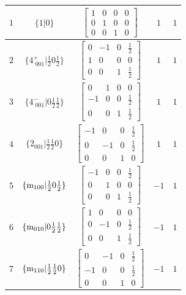 \documentclass[fleqn,8pt]{jsarticle}
\begin{document}
\begin{longtable}{ccccc}
$ 1 $ & $ \{1|0\} $ & $ \begin{bmatrix} 1 & 0 & 0 & 0 \\ 0 & 1 & 0 & 0 \\ 0 & 0 & 1 & 0 \end{bmatrix} $ & $ 1 $ & $ 1 $ \\ \hline
$ 2 $ & $ \{4^{+}_{\,\,001}|\frac{1}{2} 0 \frac{1}{2}\} $ & $ \begin{bmatrix} 0 & -1 & 0 & \frac{1}{2} \\ 1 & 0 & 0 & 0 \\ 0 & 0 & 1 & \frac{1}{2} \end{bmatrix} $ & $ 1 $ & $ 1 $ \\ \hline
$ 3 $ & $ \{4^{-}_{\,\,001}|0 \frac{1}{2} \frac{1}{2}\} $ & $ \begin{bmatrix} 0 & 1 & 0 & 0 \\ -1 & 0 & 0 & \frac{1}{2} \\ 0 & 0 & 1 & \frac{1}{2} \end{bmatrix} $ & $ 1 $ & $ 1 $ \\ \hline
$ 4 $ & $ \{2{}_{001}|\frac{1}{2} \frac{1}{2} 0\} $ & $ \begin{bmatrix} -1 & 0 & 0 & \frac{1}{2} \\ 0 & -1 & 0 & \frac{1}{2} \\ 0 & 0 & 1 & 0 \end{bmatrix} $ & $ 1 $ & $ 1 $ \\ \hline
$ 5 $ & $ \{{\rm m}_{100}|\frac{1}{2} 0 \frac{1}{2}\} $ & $ \begin{bmatrix} -1 & 0 & 0 & \frac{1}{2} \\ 0 & 1 & 0 & 0 \\ 0 & 0 & 1 & \frac{1}{2} \end{bmatrix} $ & $ -1 $ & $ 1 $ \\ \hline
$ 6 $ & $ \{{\rm m}_{010}|0 \frac{1}{2} \frac{1}{2}\} $ & $ \begin{bmatrix} 1 & 0 & 0 & 0 \\ 0 & -1 & 0 & \frac{1}{2} \\ 0 & 0 & 1 & \frac{1}{2} \end{bmatrix} $ & $ -1 $ & $ 1 $ \\ \hline
$ 7 $ & $ \{{\rm m}_{110}|\frac{1}{2} \frac{1}{2} 0\} $ & $ \begin{bmatrix} 0 & -1 & 0 & \frac{1}{2} \\ -1 & 0 & 0 & \frac{1}{2} \\ 0 & 0 & 1 & 0 \end{bmatrix} $ & $ -1 $ & $ 1 $ \\ \hline

\end{longtable}
\end{document}
